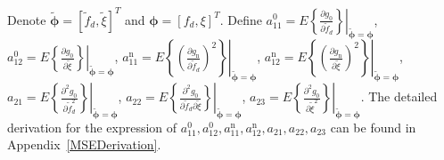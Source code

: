 \documentclass[12pt, draftclsnofoot, onecolumn]{IEEEtran}
\begin{document}
Denote $\boldsymbol{\tilde{\phi}} \!=\! \left[ {\tilde{f}}_{d}, \tilde{\xi} \right]^{T}$ and $\boldsymbol{\phi} \!=\! \left[ {f}_{d}, \xi \right]^{T}$. Define $a_{11}^{0} \!=\! {E{\left. \left\{ \frac{\partial {{g}_{0}}}{\partial \tilde{f}_d} \right\} \right|}_{ \boldsymbol{\tilde{\phi}} = \boldsymbol{\phi} }}$, $a_{12}^{0} \!=\! {E{\left. \left\{ \frac{\partial {{g}_{0}}}{\partial \tilde{\xi }} \right\} \right|}_{ \boldsymbol{\tilde{\phi}} = \boldsymbol{\phi} }}$, $a_{11}^{\mathrm{n}} \!=\! E{{\left. \left\{ {{\left( \frac{\partial {{g}_{\mathrm{n}}}}{\partial {{{\tilde{f}}}_{d}}} \right)}^{2}} \right\} \right|}_{\boldsymbol{\tilde{\phi}} = \boldsymbol{\phi} }}$, $a_{12}^{\mathrm{n}} \!=\! E{{\left. \left\{ {{\left( \frac{\partial {{g}_{\mathrm{n}}}}{\partial {{{\tilde{\xi}}}}} \right)}^{2}} \right\} \right|}_{\boldsymbol{\tilde{\phi}} = \boldsymbol{\phi} }}$, ${{a}_{21}} \!=\! {{\left. E\left\{ \frac{{{\partial }^{2}}{{g}_{0}}}{\partial \tilde{f}_{d}^{2}} \right\} \right|}_{\boldsymbol{\tilde{\phi}} = \boldsymbol{\phi} }}$, ${{a}_{22}} \!=\! {{\left. E\left\{ \frac{{{\partial }^{2}}{{g}_{0}}}{\partial {{{\tilde{f}}}_{d}}\partial \tilde{\xi }} \right\} \right|}_{\boldsymbol{\tilde{\phi}} = \boldsymbol{\phi} }}$, ${{a}_{23}} \!=\! {{\left. E\left\{ \frac{{{\partial }^{2}}{{g}_{0}}}{\partial {{{\tilde{\xi }}}^{2}}} \right\} \right|}_{\boldsymbol{\tilde{\phi}} = \boldsymbol{\phi} }}$. The detailed derivation for the expression of $a_{11}^{0}, a_{12}^{0}, a_{11}^{\mathrm{n}}, a_{12}^{\mathrm{n}}, a_{21}, a_{22}, a_{23}$ can be found in Appendix~\ref{MSEDerivation}.
%
%
%
\end{document}
